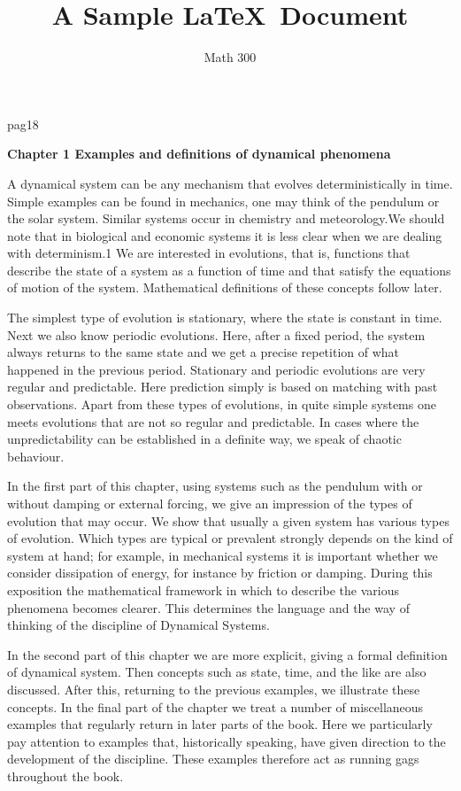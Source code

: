 \documentclass[12pt]{article}
\title{A Sample \LaTeX\ Document}
\author{Math 300}
\begin{document}

pag18

\hfill

\textbf{Chapter 1
Examples and definitions of dynamical
phenomena
}

\hfill

A dynamical system can be any mechanism that evolves deterministically in time.
Simple examples can be found in mechanics, one may think of the pendulum or the
solar system. Similar systems occur in chemistry and meteorology.We should note
that in biological and economic systems it is less clear when we are dealing with
determinism.1 We are interested in evolutions, that is, functions that describe the
state of a system as a function of time and that satisfy the equations of motion of the
system. Mathematical definitions of these concepts follow later.

\hfill

The simplest type of evolution is stationary, where the state is constant in time.
Next we also know periodic evolutions. Here, after a fixed period, the system always
returns to the same state and we get a precise repetition of what happened in the
previous period. Stationary and periodic evolutions are very regular and predictable.
Here prediction simply is based on matching with past observations. Apart from
these types of evolutions, in quite simple systems one meets evolutions that are not
so regular and predictable. In cases where the unpredictability can be established in
a definite way, we speak of chaotic behaviour.

\hfill

In the first part of this chapter, using systems such as the pendulum with or without
damping or external forcing, we give an impression of the types of evolution
that may occur. We show that usually a given system has various types of evolution.
Which types are typical or prevalent strongly depends on the kind of system
at hand; for example, in mechanical systems it is important whether we consider
dissipation of energy, for instance by friction or damping. During this exposition
the mathematical framework in which to describe the various phenomena becomes
clearer. This determines the language and the way of thinking of the discipline of
Dynamical Systems.

\hfill

In the second part of this chapter we are more explicit, giving a formal definition
of dynamical system. Then concepts such as state, time, and the like are also
discussed. After this, returning to the previous examples, we illustrate these concepts.
In the final part of the chapter we treat a number of miscellaneous examples
that regularly return in later parts of the book. Here we particularly pay attention to
examples that, historically speaking, have given direction to the development of the
discipline. These examples therefore act as running gags throughout the book.
\end{document}
